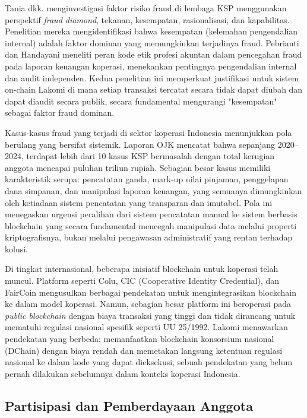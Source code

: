 Tania dkk. \cite{tania2025investigasi} menginvestigasi faktor risiko fraud di lembaga KSP menggunakan perspektif \textit{fraud diamond}, tekanan, kesempatan, rasionalisasi, dan kapabilitas. Penelitian mereka mengidentifikasi bahwa kesempatan (kelemahan pengendalian internal) adalah faktor dominan yang memungkinkan terjadinya fraud. Pebrianti dan Handayani \cite{pebrianti2024peran} meneliti peran kode etik profesi akuntan dalam pencegahan fraud pada laporan keuangan koperasi, menekankan pentingnya pengendalian internal dan audit independen. Kedua penelitian ini memperkuat justifikasi untuk sistem on-chain Lakomi di mana setiap transaksi tercatat secara tidak dapat diubah dan dapat diaudit secara publik, secara fundamental mengurangi "kesempatan" sebagai faktor fraud dominan.

Kasus-kasus fraud yang terjadi di sektor koperasi Indonesia menunjukkan pola berulang yang bersifat sistemik. Laporan OJK mencatat bahwa sepanjang 2020--2024, terdapat lebih dari 10 kasus KSP bermasalah dengan total kerugian anggota mencapai puluhan triliun rupiah. Sebagian besar kasus memiliki karakteristik serupa: pencatatan ganda, mark-up nilai pinjaman, penggelapan dana simpanan, dan manipulasi laporan keuangan, yang semuanya dimungkinkan oleh ketiadaan sistem pencatatan yang transparan dan imutabel. Pola ini menegaskan urgensi peralihan dari sistem pencatatan manual ke sistem berbasis blockchain yang secara fundamental mencegah manipulasi data melalui properti kriptografisnya, bukan melalui pengawasan administratif yang rentan terhadap kolusi.

Di tingkat internasional, beberapa inisiatif blockchain untuk koperasi telah muncul. Platform seperti Colu, CIC (Cooperative Identity Credential), dan FairCoin mengusulkan berbagai pendekatan untuk mengintegrasikan blockchain ke dalam model koperasi. Namun, sebagian besar platform ini beroperasi pada \textit{public blockchain} dengan biaya transaksi yang tinggi dan tidak dirancang untuk mematuhi regulasi nasional spesifik seperti UU 25/1992. Lakomi menawarkan pendekatan yang berbeda: memanfaatkan blockchain konsorsium nasional (DChain) dengan biaya rendah dan memetakan langsung ketentuan regulasi nasional ke dalam kode yang dapat dieksekusi, sebuah pendekatan yang belum pernah dilakukan sebelumnya dalam konteks koperasi Indonesia.

\subsection{Partisipasi dan Pemberdayaan Anggota}

